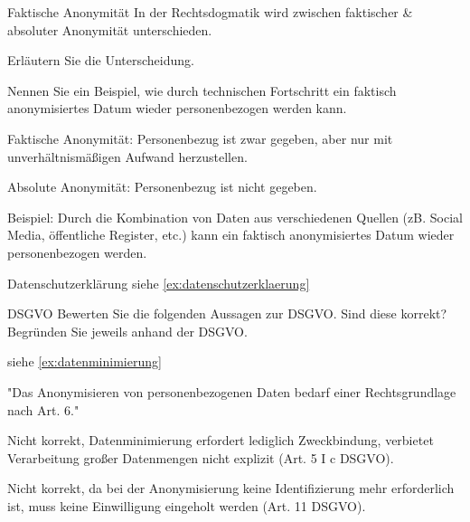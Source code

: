 \documentclass{article}
\begin{document}
\begin{eexercises}{Faktische Anonymität}{
    In der Rechtsdogmatik wird zwischen faktischer \& absoluter Anonymität unterschieden.
  }
  \item Erläutern Sie die Unterscheidung.
  \item Nennen Sie ein Beispiel, wie durch technischen Fortschritt ein faktisch anonymisiertes Datum wieder personenbezogen werden kann.
\end{eexercises}

\begin{solutions}
  \item Faktische Anonymität: Personenbezug ist zwar gegeben, aber nur mit unverhältnismäßigen Aufwand herzustellen.\par Absolute Anonymität: Personenbezug ist nicht gegeben.
  \item Beispiel: Durch die Kombination von Daten aus verschiedenen Quellen (zB. Social Media, öffentliche Register, etc.) kann ein faktisch anonymisiertes Datum wieder personenbezogen werden.
\end{solutions}

\begin{exercise}{Datenschutzerklärung}
  siehe \ref{ex:datenschutzerklaerung}
\end{exercise}

\begin{eexercises}[2]{DSGVO}{
    Bewerten Sie die folgenden Aussagen zur DSGVO. Sind diese korrekt? Begründen Sie jeweils anhand der DSGVO.
  }
  \item siehe \ref{ex:datenminimierung}
  \item "Das Anonymisieren von personenbezogenen Daten bedarf einer Rechtsgrundlage nach Art. 6."
\end{eexercises}

\begin{solutions}
  \item Nicht korrekt, Datenminimierung erfordert lediglich Zweckbindung, verbietet Verarbeitung großer Datenmengen nicht explizit (Art. 5 I c DSGVO).
  \item Nicht korrekt, da bei der Anonymisierung keine Identifizierung mehr erforderlich ist, muss keine Einwilligung eingeholt werden (Art. 11 DSGVO).
\end{solutions}
\end{document}
